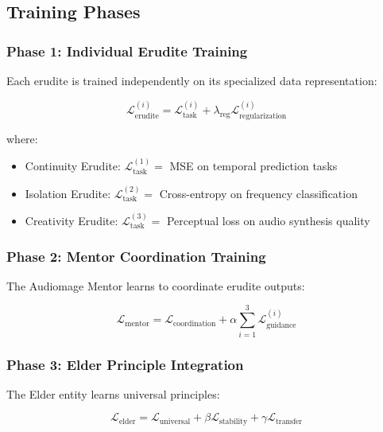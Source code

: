 \subsection{Training Phases}

\subsubsection{Phase 1: Individual Erudite Training}
Each erudite is trained independently on its specialized data representation:

\begin{equation}
\mathcal{L}_{\text{erudite}}^{(i)} = \mathcal{L}_{\text{task}}^{(i)} + \lambda_{\text{reg}} \mathcal{L}_{\text{regularization}}^{(i)}
\end{equation}

where:
\begin{itemize}
    \item Continuity Erudite: $\mathcal{L}_{\text{task}}^{(1)} = $ MSE on temporal prediction tasks
    \item Isolation Erudite: $\mathcal{L}_{\text{task}}^{(2)} = $ Cross-entropy on frequency classification
    \item Creativity Erudite: $\mathcal{L}_{\text{task}}^{(3)} = $ Perceptual loss on audio synthesis quality
\end{itemize}

\subsubsection{Phase 2: Mentor Coordination Training}
The Audiomage Mentor learns to coordinate erudite outputs:

\begin{equation}
\mathcal{L}_{\text{mentor}} = \mathcal{L}_{\text{coordination}} + \alpha \sum_{i=1}^{3} \mathcal{L}_{\text{guidance}}^{(i)}
\end{equation}

\subsubsection{Phase 3: Elder Principle Integration}
The Elder entity learns universal principles:

\begin{equation}
\mathcal{L}_{\text{elder}} = \mathcal{L}_{\text{universal}} + \beta \mathcal{L}_{\text{stability}} + \gamma \mathcal{L}_{\text{transfer}}
\end{equation}

